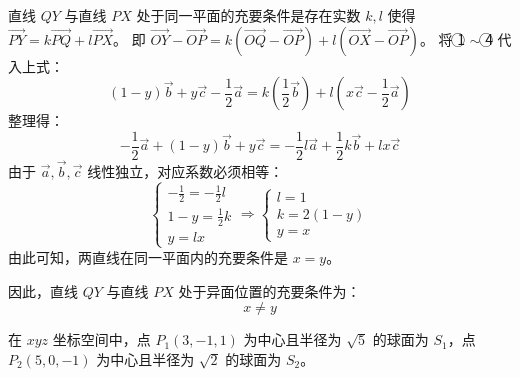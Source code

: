 \begin{questions}
\begin{solution}
    
    直线 $QY$ 与直线 $PX$ 处于同一平面的充要条件是存在实数 $k, l$ 使得 $\vec{PY} = k\vec{PQ} + l\vec{PX}$。
    即 $\vec{OY} - \vec{OP} = k(\vec{OQ} - \vec{OP}) + l(\vec{OX} - \vec{OP})$。
    将 \textcircled{1} $\sim$ \textcircled{4} 代入上式：
    \[ 
    (1-y)\vec{b} + y\vec{c} - \frac{1}{2}\vec{a} = k\left( \frac{1}{2}\vec{b} \right) + l\left( x\vec{c} - \frac{1}{2}\vec{a} \right) 
    \]
    整理得：
    \[ -\frac{1}{2}\vec{a} + (1-y)\vec{b} + y\vec{c} = -\frac{1}{2}l\vec{a} + \frac{1}{2}k\vec{b} + lx\vec{c} \]
    由于 $\vec{a}, \vec{b}, \vec{c}$ 线性独立，对应系数必须相等：
    \[ \begin{cases} -\frac{1}{2} = -\frac{1}{2}l \\ 1-y = \frac{1}{2}k \\ y = lx \end{cases} \Rightarrow \begin{cases} l = 1 \\ k = 2(1-y) \\ y = x \end{cases} \text{} \]
    由此可知，两直线在同一平面内的充要条件是 $x = y$。
    
    因此，直线 $QY$ 与直线 $PX$ 处于异面位置的充要条件为：
    \[ 
    x \neq y 
    \]
\end{solution}

\question
在 $xyz$ 坐标空间中，点 $P_1(3, -1, 1)$ 为中心且半径为 $\sqrt{5}$ 的球面为 $S_1$，点 $P_2(5, 0, -1)$ 为中心且半径为 $\sqrt{2}$ 的球面为 $S_2$。
\end{questions}
